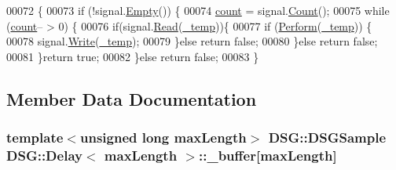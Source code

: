 \begin{DoxyCode}
00072                                                                  \{
00073         \textcolor{keywordflow}{if} (!signal.\hyperlink{class_d_s_g_1_1_ring_buffer_ac1346f5842d08b988a5297abe4089b96}{Empty}()) \{
00074             \hyperlink{class_d_s_g_1_1_delay_a1d54836950db9724434880d859d1e3ea}{count} = signal.\hyperlink{class_d_s_g_1_1_ring_buffer_a9bd79b0a6dff618b205e396c101ee070}{Count}();
00075             \textcolor{keywordflow}{while} (\hyperlink{class_d_s_g_1_1_delay_a1d54836950db9724434880d859d1e3ea}{count}-- > 0) \{
00076                 \textcolor{keywordflow}{if}(signal.\hyperlink{class_d_s_g_1_1_ring_buffer_a6b2848a64f15c7b0c320779582fa0fbe}{Read}(\hyperlink{class_d_s_g_1_1_delay_a039bb7a3a39aff5841b9e808cacc1a6e}{\_temp}))\{
00077                     \textcolor{keywordflow}{if} (\hyperlink{class_d_s_g_1_1_delay_afe853b73a1d7d1e5720277e5d956b209}{Perform}(\hyperlink{class_d_s_g_1_1_delay_a039bb7a3a39aff5841b9e808cacc1a6e}{\_temp})) \{
00078                         signal.\hyperlink{class_d_s_g_1_1_ring_buffer_aa5dd2caa0a270173251faee40a43d692}{Write}(\hyperlink{class_d_s_g_1_1_delay_a039bb7a3a39aff5841b9e808cacc1a6e}{\_temp});
00079                     \}\textcolor{keywordflow}{else} \textcolor{keywordflow}{return} \textcolor{keyword}{false};
00080                 \}\textcolor{keywordflow}{else} \textcolor{keywordflow}{return} \textcolor{keyword}{false};
00081             \}\textcolor{keywordflow}{return} \textcolor{keyword}{true};
00082         \}\textcolor{keywordflow}{else} \textcolor{keywordflow}{return} \textcolor{keyword}{false};
00083     \}
\end{DoxyCode}


\subsection{Member Data Documentation}
\hypertarget{class_d_s_g_1_1_delay_a8c86e03e9656476371f98d049ae1c5c9}{
\subsubsection[{\+\_\+buffer}]{\setlength{\rightskip}{0pt plus 5cm}template$<$unsigned long max\+Length$>$ {\bf D\+S\+G\+::\+D\+S\+G\+Sample} {\bf D\+S\+G\+::\+Delay}$<$ max\+Length $>$\+::\+\_\+buffer\mbox{[}max\+Length\mbox{]}\hspace{0.3cm}{\ttfamily [protected]}}}\label{class_d_s_g_1_1_delay_a8c86e03e9656476371f98d049ae1c5c9}


